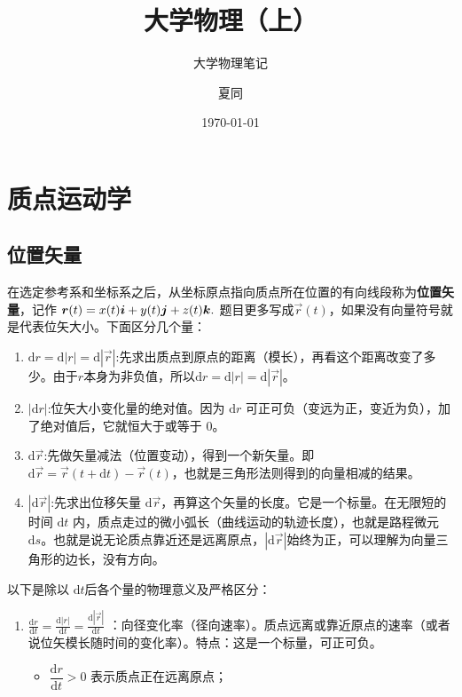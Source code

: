 \documentclass[lang=cn,11pt]{elegantbook}
\title{大学物理（上）}
\subtitle{大学物理笔记}
\author{夏同}
\institute{华南理工大学}
\date{\today}
\begin{document}
\maketitle
\frontmatter
{}

\tableofcontents
\makeenvindex
\mainmatter

\chapter{质点运动学}

\section{位置矢量}

\begin{definition}[位置矢量]\label{def:position-vector}
在选定参考系和坐标系之后，从坐标原点指向质点所在位置的有向线段称为\textbf{位置矢量}，记作
 \(\vb*{r}(t)=x(t)\vb*{i}+y(t)\vb*{j}+z(t)\vb*{k}.\) 题目更多写成$\vec{r}(t)$，如果没有向量符号就是代表位矢大小。下面区分几个量：
\begin{enumerate}
\item $\mathrm{d}r=\mathrm{d}|r|=\mathrm{d}|\vec{r}|$:先求出质点到原点的距离（模长），再看这个距离改变了多少。由于$r$本身为非负值，所以$\mathrm{d}r=\mathrm{d}|r|=\mathrm{d}|\vec{r}|$。
\item $|\mathrm{d}r|$:位矢大小变化量的绝对值。因为 $\mathrm{d}r$ 可正可负（变远为正，变近为负），加了绝对值后，它就恒大于或等于 0。
\item $\mathrm{d}\vec{r}$:先做矢量减法（位置变动），得到一个新矢量。即 $\mathrm{d}\vec{r} = \vec{r}(t+\mathrm{d}t) - \vec{r}(t)$，也就是三角形法则得到的向量相减的结果。
\item $|\mathrm{d}\vec{r}|$:先求出位移矢量 $\mathrm{d}\vec{r}$，再算这个矢量的长度。它是一个标量。在无限短的时间 $\mathrm{d}t$ 内，质点走过的微小弧长（曲线运动的轨迹长度），也就是路程微元 $\mathrm{d}s$。也就是说无论质点靠近还是远离原点，$|\mathrm{d}\vec{r}|$始终为正，可以理解为向量三角形的边长，没有方向。
\end{enumerate}
以下是除以 $\mathrm{d}t$后各个量的物理意义及严格区分：
\begin{enumerate}
\item $\frac{\mathrm{d}r}{\mathrm{d}t} = \frac{\mathrm{d}|r|}{\mathrm{d}t} = \frac{\mathrm{d}|\vec{r}|}{\mathrm{d}t}$ ：向径变化率（径向速率）。质点远离或靠近原点的速率（或者说位矢模长随时间的变化率）。特点：这是一个标量，可正可负。
\begin{itemize}
\item $\dfrac{\mathrm{d}r}{\mathrm{d}t} > 0$ 表示质点正在远离原点；

\end{itemize}
\end{enumerate}
\end{definition}
\end{document}
